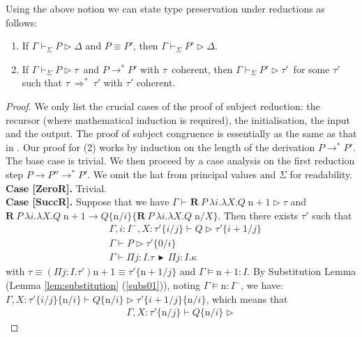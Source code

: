 \documentclass{LMCS}
\newcommand{\X}{\ensuremath{X}}
\newcommand{\RECSEQP}[4]{\ensuremath{\mathbf{R} \ #1\ \lambda #2.\lambda #3.#4}}
\newcommand{\redsym}{\ensuremath{\longrightarrow}}
\newcommand{\red}[2]{\ensuremath{#1\redsym#2}}
\newcommand{\redM}[2]{\ensuremath{#1\redsym^*#2}}
\newcommand{\sub}[2]{\ensuremath{\{#1/#2\}}}
\newcommand{\subst}[2]{\ensuremath{\{#1 / #2\}}}
\newcommand{\Ga}{\ensuremath{\Gamma}}
\newcommand{\D}{\ensuremath{\Delta}}
\newcommand{\derqq}[4]{\ensuremath{#1 \vdash_{#2} #3 \triangleright #4}}
\newcommand{\seredstar}[2]{\ensuremath{{#1}~\Rightarrow^*~{#2}}}
\newcommand{\GR}[4]{\RECSEQP{#1}{#2}{#3}{#4}}
\newcommand{\APP}{\;}
\newcommand{\ii}{\ensuremath{i}}
\newcommand{\jj}{\ensuremath{j}}
\newcommand{\n}{\ensuremath{\mathrm{n}}}
\newcommand{\II}{\ensuremath{I}}
\newcommand{\K}{\ensuremath{\kappa}}
\newcommand{\PP}{\ensuremath{P}}
\newcommand{\QQ}{\ensuremath{Q}}
\newcommand{\Ty}{\ensuremath{\tau}}
\newcommand{\RHD}{\,\ensuremath{\blacktriangleright}\,}
\newcommand{\minus}[1]{\ensuremath{#1^{-}}}
\newcommand{\AT}[2]{#1\! : \! #2}
\begin{document}
Using the above notion we can state type preservation under reductions
as follows:
\begin{thm}\label{thm:sr}\mbox{\;}

\begin{enumerate}[\em(1)]
\item
If $\derqq\Ga{\Sigma}\PP\D$ and $\PP\equiv{\PP'}$, then
\derqq\Ga{\Sigma}{\PP'}{\D}. 
\item 
If \derqq\Ga{\Sigma}\PP\Ty\ and \redM\PP{\PP'} with 
\Ty\ coherent, then
\derqq\Ga{\Sigma}{\PP'}{\Ty'}\ for some $\Ty'$ such that
$\seredstar\Ty\Ty'$ with $\Ty'$ coherent.
\end{enumerate}
\end{thm}
\begin{proof}
  We only list the crucial cases of the proof of subject reduction: the recursor
  (where mathematical induction is required), the initialisation, the input and
  the output.  The proof of subject congruence is essentially as the same as
  that in \cite{CHY07,BettiniCDLDY08LONG}.  Our proof for (2) works by induction
  on the length of the derivation \redM\PP{\PP'}. The base case is trivial. We
  then proceed by a case analysis on the first reduction step
  \red\PP{\PP''}\redM{}{\PP'}. We omit the hat from principal values and
  $\Sigma$ for readability.
\\[1mm]
{\bf Case [ZeroR].}  Trivial. \\[1mm]
{\bf Case [SuccR].}  Suppose 
that we have
$\derqq\Ga{}{\GR{P}{\ii}{X}{Q}\APP \n+1}{\tau}$
and 
$\red{\GR{P}{\ii}{X}{Q}\APP \n+1}
{Q\sub{\n}{\ii}\sub{\GR{P}{\ii}{X}{Q}\APP \n}{X}}$. 
Then there exists $\Ty'$ such that 
\begin{eqnarray}
& 
\label{eq:rec1}
\Gamma, \ii : \minus{\II},\X:\Ty'\sub{\ii}{\jj}  \vdash \QQ  \rhd
  \Ty'\sub{\ii+1}{\jj} \\
& 
\label{eq:rec2}
\derqq\Ga{}{P}{\Ty'\subst{0}{\ii}}\\ 
& 
\label{eq:rec3}
\Gamma\vdash \Pi \AT{\jj}{\II}.\Ty \RHD \Pi\AT{\jj}{\II}.\K
\end{eqnarray}
with 
$\Ty \equiv (\Pi\AT{\jj}{\II}.\Ty') \n+1 \equiv \Ty'\subst{\n+1}{\jj}$
and $\Ga{\models}{\n+1:\II}$. 
By Substitution Lemma (Lemma \ref{lem:substitution} (\ref{subs01})), 
noting $\Ga{\models}{\n: \minus{\II}}$,  
we have: 
$\Gamma, \X:\Ty'\sub{\ii}{\jj}\sub{\n}{\ii}  \vdash \QQ\sub{\n}{\ii}  \rhd
  \Ty'\sub{\ii+1}{\jj}\sub{\n}{\ii}$, 
which means that 
\begin{eqnarray}
\label{eq:subs}
\Gamma, \X:\Ty'\sub{\n}{\jj}  \vdash \QQ\sub{\n}{\ii}  \rhd

\end{eqnarray}
\end{proof}
\end{document}
